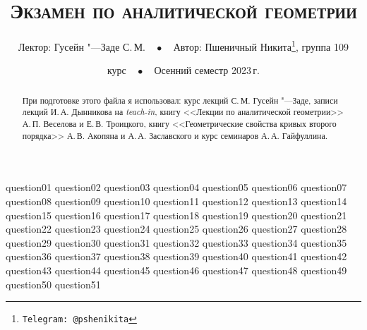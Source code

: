 \documentclass[a4paper, 11pt]{article}
\begin{document}
\title{\bfseries\scshape Экзамен по аналитической геометрии}
\author{Лектор: Гусейн "---Заде С.\,М.$\quad\bullet\quad$Автор: Пшеничный Никита\thanks{\texttt{Telegram: @pshenikita}}, группа 109}
\date{ курс$\quad\bullet\quad$Осенний семестр 2023\,г.}

\maketitle

\begin{abstract}
    При подготовке этого файла я использовал: курс лекций С.\,М. Гусейн "---Заде, записи лекций И.\,А. Дынникова на \textit{teach-in}, книгу <<Лекции по аналитической геометрии>> А.\,П. Веселова и Е.\,В. Троицкого, книгу <<Геометрические свойства кривых второго порядка>> А.\,В. Акопяна и А.\,А. Заславского и курс семинаров А.\,А. Гайфуллина.
\end{abstract}

\tableofcontents

{question01}
{question02}
{question03}
{question04}
{question05}
{question06}
{question07}
{question08}
{question09}
{question10}
{question11}
{question12}
{question13}
{question14}
{question15}
{question16}
{question17}
{question18}
{question19}
{question20}
{question21}
{question22}
{question23}
{question24}
{question25}
{question26}
{question27}
{question28}
{question29}
{question30}
{question31}
{question32}
{question33}
{question34}
{question35}
{question36}
{question37}
{question38}
{question39}
{question40}
{question41}
{question42}
{question43}
{question44}
{question45}
{question46}
{question47}
{question48}
{question49}
{question50}
{question51}
\end{document}
